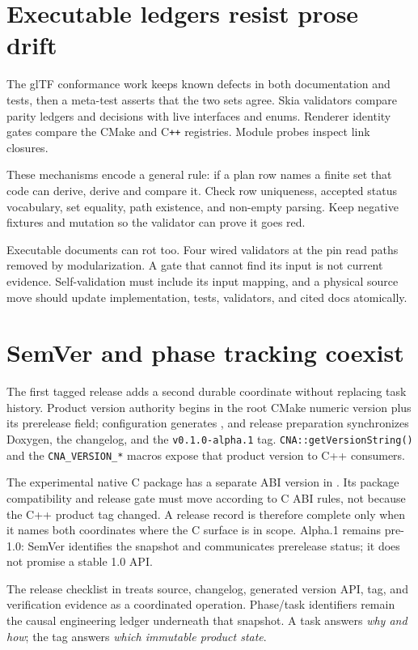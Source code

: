 \section{Executable ledgers resist prose drift}

The glTF conformance work keeps known defects in both documentation and tests, then a meta-test
asserts that the two sets agree.  Skia validators compare parity ledgers and decisions with live
interfaces and enums.  Renderer identity gates compare the CMake and C\texttt{++} registries.
Module probes inspect link closures.

These mechanisms encode a general rule: if a plan row names a finite set that code can derive,
derive and compare it.  Check row uniqueness, accepted status vocabulary, set equality, path
existence, and non-empty parsing.  Keep negative fixtures and mutation so the validator can prove it
goes red.

Executable documents can rot too.  Four wired validators at the pin read paths removed by
modularization.  A gate that cannot find its input is not current evidence.  Self-validation must
include its input mapping, and a physical source move should update implementation, tests,
validators, and cited docs atomically.

\section{SemVer and phase tracking coexist}

The first tagged release adds a second durable coordinate without replacing task history.
Product version authority begins in the root CMake numeric version plus its prerelease field;
configuration generates , and release preparation synchronizes Doxygen,
the changelog, and the \texttt{v0.1.0-alpha.1} tag. \texttt{CNA::getVersionString()} and the
\texttt{CNA\_VERSION\_*} macros expose that product version to C++ consumers.

The experimental native C package has a separate ABI version in . Its package
compatibility and release gate must move according to C ABI rules, not because the C++ product tag
changed. A release record is therefore complete only when it names both coordinates where the C
surface is in scope. Alpha.1 remains pre-1.0: SemVer identifies the snapshot and communicates
prerelease status; it does not promise a stable 1.0 API.

The release checklist in  treats source, changelog, generated version API,
tag, and verification evidence as a coordinated operation. Phase/task identifiers remain the
causal engineering ledger underneath that snapshot. A task answers \emph{why and how}; the tag
answers \emph{which immutable product state}.

